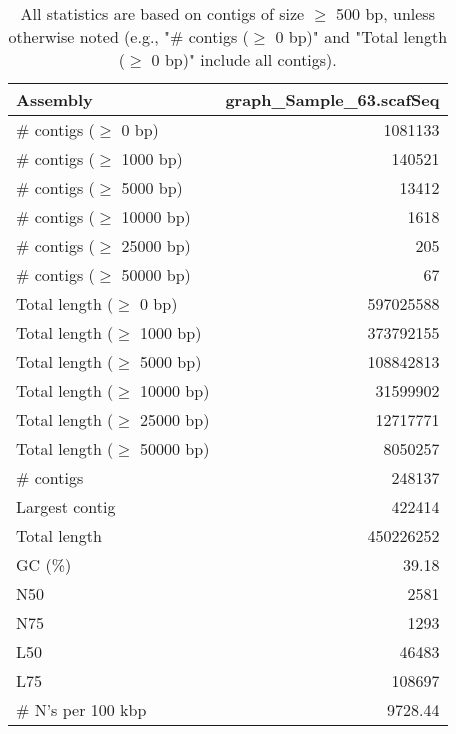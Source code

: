 \documentclass[12pt,a4paper]{article}
\begin{document}
\begin{table}[ht]
\begin{center}
\caption{All statistics are based on contigs of size $\geq$ 500 bp, unless otherwise noted (e.g., "\# contigs ($\geq$ 0 bp)" and "Total length ($\geq$ 0 bp)" include all contigs).}
\begin{tabular}{|l*{1}{|r}|}
\hline
Assembly & graph\_Sample\_63.scafSeq \\ \hline
\# contigs ($\geq$ 0 bp) & 1081133 \\ \hline
\# contigs ($\geq$ 1000 bp) & 140521 \\ \hline
\# contigs ($\geq$ 5000 bp) & 13412 \\ \hline
\# contigs ($\geq$ 10000 bp) & 1618 \\ \hline
\# contigs ($\geq$ 25000 bp) & 205 \\ \hline
\# contigs ($\geq$ 50000 bp) & 67 \\ \hline
Total length ($\geq$ 0 bp) & 597025588 \\ \hline
Total length ($\geq$ 1000 bp) & 373792155 \\ \hline
Total length ($\geq$ 5000 bp) & 108842813 \\ \hline
Total length ($\geq$ 10000 bp) & 31599902 \\ \hline
Total length ($\geq$ 25000 bp) & 12717771 \\ \hline
Total length ($\geq$ 50000 bp) & 8050257 \\ \hline
\# contigs & 248137 \\ \hline
Largest contig & 422414 \\ \hline
Total length & 450226252 \\ \hline
GC (\%) & 39.18 \\ \hline
N50 & 2581 \\ \hline
N75 & 1293 \\ \hline
L50 & 46483 \\ \hline
L75 & 108697 \\ \hline
\# N's per 100 kbp & 9728.44 \\ \hline
\end{tabular}
\end{center}
\end{table}
\end{document}
